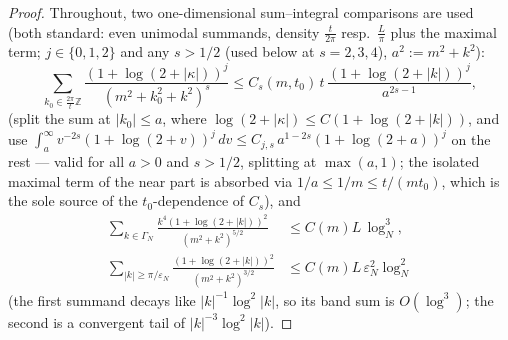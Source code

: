 \documentclass[11pt,a4paper]{article}
\theoremstyle{plain}
\theoremstyle{definition}
\newcommand{\Z}{\mathbb{Z}}
\newcommand{\eps}{\varepsilon}
\begin{document}
\begin{proof}
Throughout, two one-dimensional sum--integral comparisons are used (both
standard: even unimodal summands, density $\tfrac t{2\pi}$ resp.\
$\tfrac L\pi$ plus the maximal term; $j\in\{0,1,2\}$ and any $s>1/2$
(used below at $s=2,3,4$),
$a^2:=m^2+k^2$):
\begin{equation}
 \sum_{k_0\in\frac{2\pi}t\Z}
 \frac{(1+\log(2+|\kappa|))^j}{(m^2+k_0^2+k^2)^{s}}
 \le C_s(m,t_0)\,t\,\frac{(1+\log(2+|k|))^j}{a^{2s-1}},
 \label{eq:k0count}
\end{equation}
(split the sum at $|k_0|\le a$, where $\log(2+|\kappa|)\le
C(1+\log(2+|k|))$, and use
$\int_a^\infty v^{-2s}(1+\log(2+v))^j\,dv\le
C_{j,s}\,a^{1-2s}(1+\log(2+a))^j$ on the rest --- valid for all $a>0$ and
$s>1/2$, splitting at $\max(a,1)$; the isolated maximal term of the near part
is absorbed via $1/a\le1/m\le t/(mt_0)$, which is the sole source of the
$t_0$-dependence of $C_s$), and
\begin{equation}
 \begin{split}
 \sum_{k\in\Gamma_N}\frac{k^4(1+\log(2+|k|))^2}{(m^2+k^2)^{5/2}}
 &\le C(m)L\,\log_N^3,\\
 \sum_{|k|\ge\pi/\eps_N}\frac{(1+\log(2+|k|))^2}{(m^2+k^2)^{3/2}}
 &\le C(m)L\,\eps_N^2\log_N^2
 \end{split}
 \label{eq:kcount}
\end{equation}
(the first summand decays like $|k|^{-1}\log^2|k|$, so its band sum is
$O(\log^3)$; the second is a convergent tail of $|k|^{-3}\log^2|k|$).


\end{proof}
\end{document}
